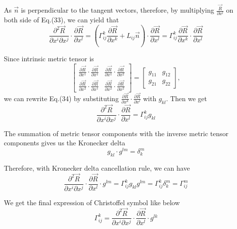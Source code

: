 \documentclass{article}
\theoremstyle{definition}
\theoremstyle{plain}
\begin{document}
As $\vec{n}$ is perpendicular to the tangent vectors, therefore, by multiplying $\frac{\vec{R}}{\partial x^l}$ on both side of Eq.(33), we can yield that
\begin{equation}
    \frac{\partial^2\vec{R}}{\partial x^i\partial x^j}\cdot\frac{\partial\vec{R}}{\partial x^l}=\left(\Gamma_{ij}^k\frac{\partial \vec{R}}{\partial x^k}+L_{ij}\vec{n}\right)\cdot\frac{\partial\vec{R}}{\partial x^l}=\Gamma_{ij}^k\frac{\partial \vec{R}}{\partial x^k}\cdot\frac{\partial\vec{R}}{\partial x^l}
\end{equation}

Since intrinsic metric tensor is
\begin{equation}
    \left[\begin{array}{cc}
        \frac{\partial\vec{R}}{\partial x^1}\cdot\frac{\partial\vec{R}}{\partial x^1} & \frac{\partial\vec{R}}{\partial x^1}\cdot\frac{\partial\vec{R}}{\partial x^2} \\
        \frac{\partial\vec{R}}{\partial x^2}\cdot\frac{\partial\vec{R}}{\partial x^1} & \frac{\partial\vec{R}}{\partial x^2}\cdot\frac{\partial\vec{R}}{\partial x^2}
    \end{array}\right]
    =
    \left[\begin{array}{cc}
        g_{11} & g_{12} \\
        g_{21} & g_{22}
    \end{array}\right],
\end{equation}
we can rewrite Eq.(34) by substituting $\frac{\partial \vec{R}}{\partial x^k}\cdot\frac{\partial\vec{R}}{\partial x^l}$ with $g_{kl}$. Then we get
\begin{equation}
    \frac{\partial^2\vec{R}}{\partial x^i\partial x^j}\cdot\frac{\partial\vec{R}}{\partial x^l}=\Gamma_{ij}^kg_{kl}
\end{equation}

The summation of metric tensor components with the inverse metric tensor components gives us the Kronecker delta
\begin{equation}
    g_{kl}\cdot g^{lm}=\delta_k^m
\end{equation}

Therefore, with Kronecker delta cancellation rule, we can have
\begin{equation}
    \frac{\partial^2\vec{R}}{\partial x^i\partial x^j}\cdot\frac{\partial\vec{R}}{\partial x^l}\cdot g^{lm}=\Gamma_{ij}^kg_{kl}g^{lm}=\Gamma_{ij}^k\delta_k^m=\Gamma_{ij}^m
\end{equation}

We get the final expression of Christoffel symbol like below
\begin{equation}
    \boxed{\Gamma_{ij}^k=\frac{\partial^2\vec{R}}{\partial x^i\partial x^j}\cdot\frac{\partial\vec{R}}{\partial x^l}\cdot g^{lk}}
\end{equation}
\end{document}
